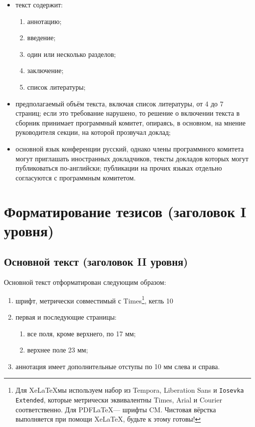 \documentclass{math-mech-sci}
\begin{document}
\begin{itemize}
\item
  текст содержит:
  \begin{enumerate}
  \item
    аннотацию;
  \item
    введение;
  \item
    один или несколько разделов;
  \item
    заключение;
  \item
    список литературы;
  \end{enumerate}
\item
  предполагаемый объём текста, включая список литературы, от 4 до 7 страниц;
  если это требование нарушено, то решение о включении текста в
  сборник принимает программный комитет, опираясь, в основном, на
  мнение руководителя секции, на которой прозвучал доклад;
\item
  основной язык конференции русский, однако члены программного
  комитета могут приглашать иностранных докладчиков, тексты докладов
  которых могут публиковаться по-английски; публикации на прочих языках
  отдельно согласуются с программным комитетом.
\end{itemize}

\section*{Форматирование тезисов (заголовок I уровня)}

\subsection*{Основной текст (заголовок II уровня)}

Основной текст отформатирован следующим образом:

\begin{enumerate}
\item
  шрифт, метрически совместимый с Times\footnote{Для \ifxetex \XeLaTeX \else Xe\LaTeX \fi мы используем набор из Tempora, \textsf{Liberation Sans} и \texttt{Iosevka Extended}, которые метрически эквивалентны Times, Arial и Courier соответственно. Для PDF\LaTeX --- шрифты CM.  Чистовая вёрстка
  выполняется при помощи \ifxetex \XeLaTeX \else Xe\LaTeX \fi, будьте к этому готовы!}, кегль 10
\item
  первая и последующие страницы:

  \begin{enumerate}
  \item
    все поля, кроме верхнего, по 17 мм;
  \item
    верхнее поле 23 мм;
  \end{enumerate}
\item
  аннотация имеет дополнительные отступы по 10 мм слева и справа.
\end{enumerate}
\end{document}
